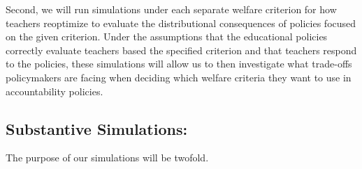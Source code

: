 \documentclass[letterpaper,12pt]{article}
\begin{document}
Second, we will run simulations under each separate welfare criterion for how teachers reoptimize to evaluate the distributional consequences of policies focused on the given criterion. Under the assumptions that the educational policies correctly evaluate teachers based the specified criterion and that teachers respond to the policies, these simulations will allow us to then investigate what trade-offs policymakers are facing when deciding which welfare criteria they want to use in accountability policies.

\subsection{Substantive Simulations:}


The purpose of our simulations will be twofold.  






    
\end{document}
